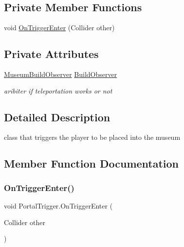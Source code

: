 \subsection*{Private Member Functions}
\begin{DoxyCompactItemize}
\item 
void \mbox{\hyperlink{class_portal_trigger_ae73070bf23c6348ced79aa839e0e2ad7}{On\+Trigger\+Enter}} (Collider other)
\end{DoxyCompactItemize}
\subsection*{Private Attributes}
\begin{DoxyCompactItemize}
\item 
\mbox{\hyperlink{class_museum_build_observer}{Museum\+Build\+Observer}} \mbox{\hyperlink{class_portal_trigger_a26ee63b0f443863cd4bc7a2626063f5b}{Build\+Observer}}
\begin{DoxyCompactList}\small\item\em aribiter if teleportation works or not \end{DoxyCompactList}\end{DoxyCompactItemize}


\subsection{Detailed Description}
class that triggers the player to be placed into the museum 



\subsection{Member Function Documentation}
\mbox{\label{class_portal_trigger_ae73070bf23c6348ced79aa839e0e2ad7}} 
\subsubsection{\texorpdfstring{On\+Trigger\+Enter()}{OnTriggerEnter()}}
{\footnotesize\ttfamily void Portal\+Trigger.\+On\+Trigger\+Enter (\begin{DoxyParamCaption}\item[{Collider}]{other }\end{DoxyParamCaption})\hspace{0.3cm}{\ttfamily [private]}}

